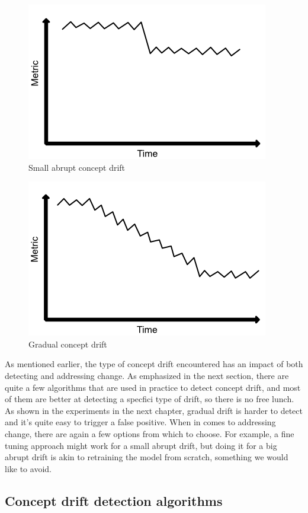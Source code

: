 \documentclass[12pt]{extreport}
\begin{document}
\begin{figure}[ht!]
\centering
\includegraphics[width=0.6\linewidth]{assets/preliminaries/small-abrupt-drift.png}
\caption{Small abrupt concept drift}
\label{fig:small-abrupt-drift}
\end{figure}

\begin{figure}[ht!]
\centering
\includegraphics[width=0.6\linewidth]{assets/preliminaries/gradual-drift.png}
\caption{Gradual concept drift}
\label{fig:gradual-drift}
\end{figure}

As mentioned earlier, the type of concept drift encountered has an impact of both detecting and addressing change. As emphasized in the next section, there are quite a few algorithms that are used in practice to detect concept drift, and most of them are better at detecting a specfici type of drift, so there is no free lunch. As shown in the experiments in the next chapter, gradual drift is harder to detect and it's quite easy to trigger a false positive. When in comes to addressing change, there are again a few options from which to choose. For example, a fine tuning approach might work for a small abrupt drift, but doing it for a big abrupt drift is akin to retraining the model from scratch, something we would like to avoid.

\subsection{Concept drift detection algorithms}
\end{document}
